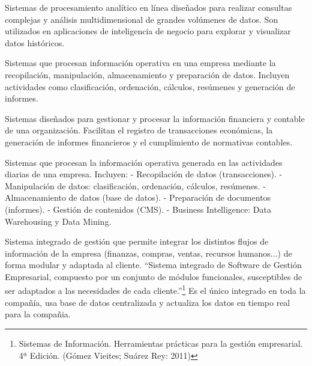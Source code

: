 \documentclass[12pt]{report} %
\begin{document}
\begin{definicion}
Sistemas de procesamiento analítico en línea diseñados para realizar consultas complejas y análisis multidimensional de grandes volúmenes de datos. Son utilizados en aplicaciones de inteligencia de negocio para explorar y visualizar datos históricos.
\end{definicion}

\begin{definicion}
Sistemas que procesan información operativa en una empresa mediante la recopilación, manipulación, almacenamiento y preparación de datos. Incluyen actividades como clasificación, ordenación, cálculos, resúmenes y generación de informes.
\end{definicion}

\begin{definicion}
Sistemas diseñados para gestionar y procesar la información financiera y contable de una organización. Facilitan el registro de transacciones económicas, la generación de informes financieros y el cumplimiento de normativas contables.
\end{definicion}

\begin{definicion}
Sistemas que procesan la información operativa generada en las actividades diarias de una empresa. Incluyen:
- Recopilación de datos (transacciones).
- Manipulación de datos: clasificación, ordenación, cálculos, resúmenes.
- Almacenamiento de datos (base de datos).
- Preparación de documentos (informes).
- Gestión de contenidos (CMS).
- Business Intelligence: Data Warehousing y Data Mining.
\end{definicion}

\begin{definicion}
Sistema integrado de gestión que permite integrar los distintos flujos de información de la empresa (finanzas, compras, ventas, recursos humanos...) de forma modular y adaptada al cliente. “Sistema integrado de Software de Gestión Empresarial, compuesto por un conjunto de módulos funcionales, susceptibles de ser adaptados a las necesidades de cada cliente.”\footnote{Sistemas de Información. Herramientas prácticas para la gestión empresarial. 4ª Edición. (Gómez Vieites; Suárez Rey: 2011)} Es el único integrado en toda la compañía, usa base de datos centralizada y actualiza los datos en tiempo real para la compañia.
\end{definicion}
\end{document}
